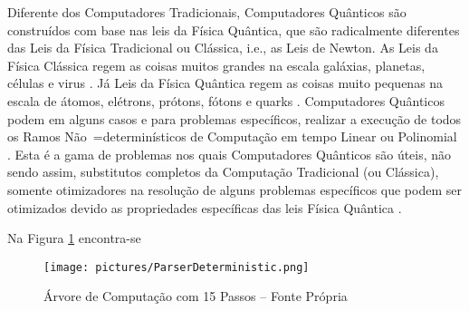 {    Diferente dos Computadores Tradicionais,
    Computadores Quânticos são construídos com base nas leis da Física Quântica,
    que são radicalmente diferentes das Leis da Física Tradicional ou Clássica,
    i.e.,
    as Leis de Newton.
    As Leis da Física Clássica regem as coisas muitos grandes na escala galáxias,
    planetas, células e
    virus \cite{halliday2013fundamentals}.
    Já Leis da Física Quântica regem as coisas muito pequenas na escala de átomos,
    elétrons, prótons, fótons e
    quarks \cite{dicke1963QuantumPhysicsIntroduction}.
    Computadores Quânticos podem em alguns casos e
    para problemas específicos,
    realizar a execução de todos os Ramos Não~=determinísticos de Computação em
    tempo Linear ou Polinomial \cite{theGoodAndBadQuantumComputing}.
    Esta é a gama de problemas nos quais Computadores Quânticos são úteis,
    não sendo assim,
    substitutos completos da Computação Tradicional (ou Clássica),
    somente otimizadores na resolução de alguns problemas específicos que podem ser otimizados
    devido as propriedades específicas das leis Física Quântica
    \cite{churchTuringQuantumComputer}.

    Na Figura \ref{fig:pictures/ParserDeterministic.png} encontra-se
    \begin{figure}[H]
    \centering
    \texttt{[image: pictures/ParserDeterministic.png]}
    \caption{Árvore de Computação com 15 Passos -- Fonte Própria}
    \label{fig:pictures/ParserDeterministic.png}
    \end{figure}
}

